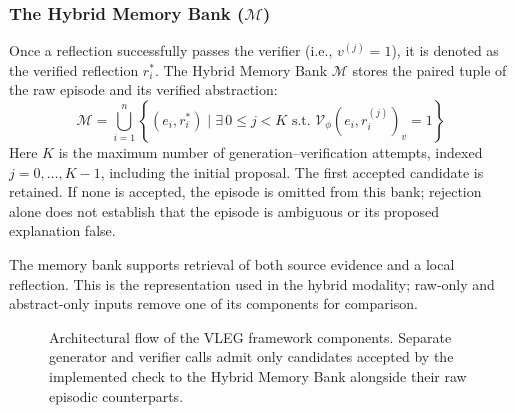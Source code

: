 \documentclass[onecolumn]{IEEEtran}
\numberwithin{equation}{section}
\theoremstyle{definition}
\theoremstyle{remark}
\begin{document}
\subsubsection{The Hybrid Memory Bank ($\mathcal{M}$)}

Once a reflection successfully passes the verifier (i.e., $v^{(j)} = 1$), it is denoted as the verified reflection $r_i^*$. The Hybrid Memory Bank $\mathcal{M}$ stores the paired tuple of the raw episode and its verified abstraction:
\begin{equation}
    \mathcal{M} = \bigcup_{i=1}^{n} \left\{ (e_i, r_i^*) \mid \exists\,0\le j<K \text{ s.t. } \mathcal{V}_\phi(e_i, r_i^{(j)})_v = 1 \right\}
\end{equation}
Here $K$ is the maximum number of generation--verification attempts, indexed $j=0,\ldots,K-1$, including the initial proposal. The first accepted candidate is retained. If none is accepted, the episode is omitted from this bank; rejection alone does not establish that the episode is ambiguous or its proposed explanation false.

The memory bank supports retrieval of both source evidence and a local reflection. This is the representation used in the hybrid modality; raw-only and abstract-only inputs remove one of its components for comparison.

\begin{figure}[htbp]
\centering
{}
\caption{Architectural flow of the VLEG framework components. Separate generator and verifier calls admit only candidates accepted by the implemented check to the Hybrid Memory Bank alongside their raw episodic counterparts.}
\label{fig:vleg_components}
\end{figure}
\end{document}
